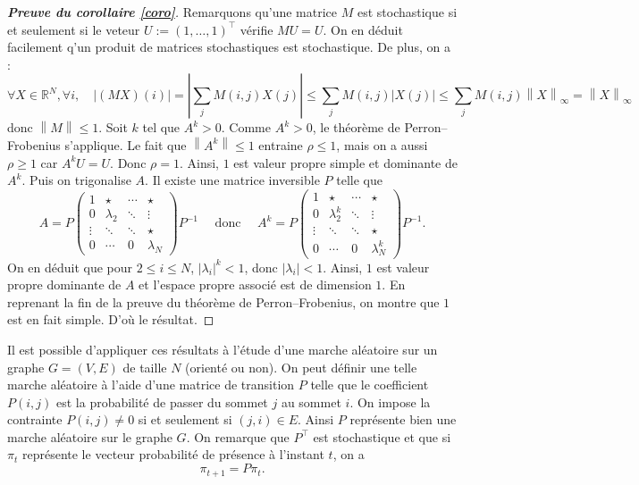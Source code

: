 \documentclass[11pt]{article}
\newcommand{\R}{\mathbb{R}}
\newcommand{\module}[1]{\left\lvert #1 \right\rvert}
\newcommand{\norm}[1]{\left\lVert #1 \right\rVert}
\renewcommand{\leq}{\leqslant}
\renewcommand{\geq}{\geqslant}
\theoremstyle{plain}
\begin{document}
\begin{proof}[\emph{\textbf{Preuve du corollaire \ref{coro}}}]
    Remarquons qu'une matrice $M$ est stochastique si et seulement si le veteur $U := (1, \ldots, 1)^{\top}$ vérifie $MU = U$. On en déduit facilement q'un produit de matrices stochastiques est stochastique. De plus, on a :
    $$\forall X \in \R^N, \forall i, \quad \module{(MX)(i)} = \module{\sum_j M(i,j)X(j)} \leq \sum_j M(i,j)\module{X(j)} \leq \sum_j M(i,j)\norm{X}_{\infty} = \norm{X}_{\infty}$$ donc $\norm{M} \leq 1$. Soit $k$ tel que $A^{k} > 0$. Comme $A^k > 0$, le théorème de Perron--Frobenius s'applique. Le fait que $\norm{A^k} \leq 1$ entraine $\rho \leq 1$, mais on a aussi $\rho \geq 1$ car $A^k U = U$. Donc $\rho = 1$. Ainsi, $1$ est valeur propre simple et dominante de $A^k$. Puis on trigonalise $A$. Il existe une matrice inversible $P$ telle que 
    $$A = P \left(
        \begin{array}{cccc}
            1      & \star     & \cdots & \star\\
            0      & \lambda_2 & \ddots & \vdots\\
            \vdots & \ddots    & \ddots & \star\\
            0      & \cdots    & 0      & \lambda_{N}
        \end{array}
    \right) P^{-1}
    \quad \text{ donc } \quad
    A^k = P \left(
        \begin{array}{cccc}
            1      & \star     & \cdots & \star\\
            0      & \lambda_{2}^{k} & \ddots & \vdots\\
            \vdots & \ddots    & \ddots & \star\\
            0      & \cdots    & 0      & \lambda_{N}^{k}
        \end{array}
    \right) P^{-1}.$$
    On en déduit que pour $2 \leq i \leq N$, $\module{\lambda_{i}}^{k} < 1$, donc $\module{\lambda_{i}} < 1$. Ainsi, $1$ est valeur propre dominante de $A$ et l'espace propre associé est de dimension $1$. En reprenant la fin de la preuve du théorème de Perron--Frobenius, on montre que $1$ est en fait simple. D'où le résultat.
\end{proof}

Il est possible d'appliquer ces résultats à l'étude d'une marche aléatoire sur un graphe $G = (V, E)$ de taille $N$ (orienté ou non). On peut définir une telle marche aléatoire à l'aide d'une matrice de transition $P$ telle que le coefficient $P(i,j)$ est la probabilité de passer du sommet $j$ au sommet $i$. On impose la contrainte $P(i,j) \neq 0$ si et seulement si $(j,i) \in E$. Ainsi $P$ représente bien une marche aléatoire sur le graphe $G$. On remarque que $P^{\top}$ est stochastique et que si $\pi_t$ représente le vecteur probabilité de présence à l'instant $t$, on a
$$\pi_{t+1} = P \pi_t.$$
\end{document}
